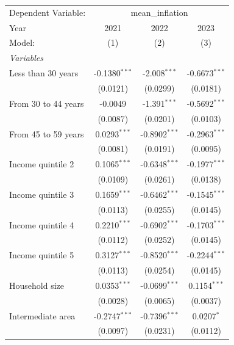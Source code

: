 
\begingroup
\centering
\begin{tabular}{lccc}
   \tabularnewline \midrule \midrule
   Dependent Variable: & \multicolumn{3}{c}{mean\_inflation}\\
   Year                   & 2021            & 2022            & 2023 \\   
   Model:                 & (1)             & (2)             & (3)\\  
   \midrule
   \emph{Variables}\\
   Less than 30 years     & -0.1380$^{***}$ & -2.008$^{***}$  & -0.6673$^{***}$\\   
                          & (0.0121)        & (0.0299)        & (0.0181)\\   
   From 30 to 44 years    & -0.0049         & -1.391$^{***}$  & -0.5692$^{***}$\\   
                          & (0.0087)        & (0.0201)        & (0.0103)\\   
   From 45 to 59 years    & 0.0293$^{***}$  & -0.8902$^{***}$ & -0.2963$^{***}$\\   
                          & (0.0081)        & (0.0191)        & (0.0095)\\   
   Income quintile 2      & 0.1065$^{***}$  & -0.6348$^{***}$ & -0.1977$^{***}$\\   
                          & (0.0109)        & (0.0261)        & (0.0138)\\   
   Income quintile 3      & 0.1659$^{***}$  & -0.6462$^{***}$ & -0.1545$^{***}$\\   
                          & (0.0113)        & (0.0255)        & (0.0145)\\   
   Income quintile 4      & 0.2210$^{***}$  & -0.6902$^{***}$ & -0.1703$^{***}$\\   
                          & (0.0112)        & (0.0252)        & (0.0145)\\   
   Income quintile 5      & 0.3127$^{***}$  & -0.8520$^{***}$ & -0.2244$^{***}$\\   
                          & (0.0113)        & (0.0254)        & (0.0145)\\   
   Household size         & 0.0353$^{***}$  & -0.0699$^{***}$ & 0.1154$^{***}$\\   
                          & (0.0028)        & (0.0065)        & (0.0037)\\   
   Intermediate area      & -0.2747$^{***}$ & -0.7396$^{***}$ & 0.0207$^{*}$\\   
                          & (0.0097)        & (0.0231)        & (0.0112)\\   

\end{tabular}
